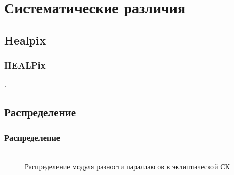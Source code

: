 \documentclass[12pt,aspectratio=43]{beamer}
\begin{document}
\section{Систематические различия}\label{sistem}

\subsection{Healpix}\label{sub:smthhealpix}
\begin{frame}[<alignment>]
\frametitle{HEALPix}

\begin{figure}[h!]
\label{img:healpix}
\end{figure}

\end{frame}	

\begin{frame}[<alignment>]
\begin{figure}[h!]
\label{img:healpix}
\end{figure}
.\end{frame}	

\subsection{Распределение}\label{sub:smthhealpix}

\begin{frame}[<alignment>]
\frametitle{Распределение}
\begin{figure}[h!]
\\{Распределение модуля разности параллаксов в эклиптической СК}
\label{img:sf_lo}
\end{figure}

\end{frame}	
\end{document}
